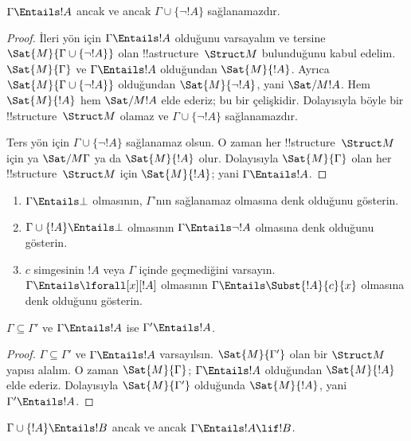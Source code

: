 \documentclass[../../../include/open-logic-section]{subfiles}
\begin{document}
\begin{prop}
$\Gamma\Entails !A$ ancak ve ancak $\Gamma\cup\{\lnot !A\}$
sağlanamazdır.
\end{prop}

\begin{proof}
İleri yön için $\Gamma\Entails !A$ olduğunu varsayalım ve tersine
$\Sat{M}{\Gamma\cup\{\lnot !A\}}$ olan !!a{structure}~$\Struct M$
bulunduğunu kabul edelim. $\Sat{M}{\Gamma}$ ve $\Gamma\Entails !A$
olduğundan $\Sat{M}{!A}$. Ayrıca
$\Sat{M}{\Gamma\cup\{\lnot !A\}}$ olduğundan $\Sat{M}{\lnot !A}$,
yani $\Sat/{M}{!A}$. Hem $\Sat{M}{!A}$ hem $\Sat/{M}{!A}$ elde
ederiz; bu bir çelişkidir. Dolayısıyla böyle bir !!{structure}~$\Struct
M$ olamaz ve $\Gamma\cup\{\lnot !A\}$ sağlanamazdır.

Ters yön için $\Gamma\cup\{\lnot !A\}$ sağlanamaz olsun. O zaman her
!!{structure}~$\Struct M$ için ya $\Sat/{M}{\Gamma}$ ya da
$\Sat{M}{!A}$ olur. Dolayısıyla $\Sat{M}{\Gamma}$ olan her
!!{structure}~$\Struct M$ için $\Sat{M}{!A}$; yani
$\Gamma\Entails !A$.
\end{proof}

\begin{prob}
\begin{enumerate}
\item $\Gamma\Entails\bot$ olmasının, $\Gamma$'nın sağlanamaz olmasına
  denk olduğunu gösterin.
\item $\Gamma\cup\{!A\}\Entails\bot$ olmasının
  $\Gamma\Entails\lnot !A$ olmasına denk olduğunu gösterin.
\item $c$ simgesinin $!A$ veya $\Gamma$ içinde geçmediğini varsayın.
  $\Gamma\Entails\lforall[x][!A]$ olmasının
  $\Gamma\Entails\Subst{!A}{c}{x}$ olmasına denk olduğunu gösterin.
\end{enumerate}
\end{prob}

\begin{prop}
$\Gamma\subseteq\Gamma'$ ve $\Gamma\Entails !A$ ise
$\Gamma'\Entails !A$.
\end{prop}

\begin{proof}
$\Gamma\subseteq\Gamma'$ ve $\Gamma\Entails !A$ varsayılsın.
$\Sat{M}{\Gamma'}$ olan bir $\Struct M$ yapısı alalım. O zaman
$\Sat{M}{\Gamma}$; $\Gamma\Entails !A$ olduğundan $\Sat{M}{!A}$ elde
ederiz. Dolayısıyla $\Sat{M}{\Gamma'}$ olduğunda $\Sat{M}{!A}$, yani
$\Gamma'\Entails !A$.
\end{proof}

\begin{thm}
$\Gamma\cup\{!A\}\Entails !B$ ancak ve ancak
$\Gamma\Entails !A\lif !B$.
\end{thm}
\end{document}
